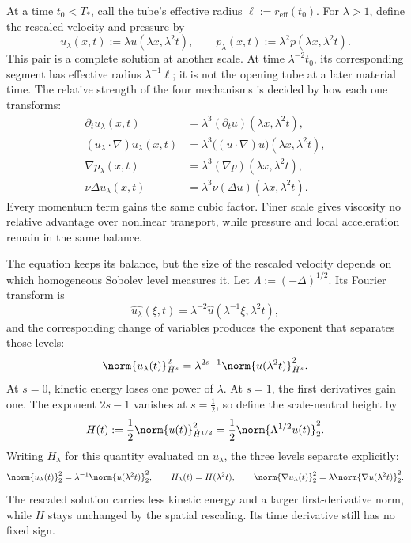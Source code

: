 
At a time \(t_0<T_*\), call the tube's effective radius \(\ell:=r_{\mathrm{eff}}(t_0)\). For \(\lambda>1\), define the rescaled velocity and pressure by
\[
  u_\lambda(x,t)
  :=
  \lambda u(\lambda x,\lambda^2t),
  \qquad
  p_\lambda(x,t)
  :=
  \lambda^2p(\lambda x,\lambda^2t).
\]
This pair is a complete \NavierStokes{} solution at another scale. At time \(\lambda^{-2}t_0\), its corresponding segment has effective radius \(\lambda^{-1}\ell\); it is not the opening tube at a later material time. The relative strength of the four mechanisms is decided by how each one transforms:
\[
\begin{aligned}
  \partial_tu_\lambda(x,t)
  &=
  \lambda^3(\partial_tu)(\lambda x,\lambda^2t),
  \\
  (u_\lambda\cdot\nabla)u_\lambda(x,t)
  &=
  \lambda^3\bigl((u\cdot\nabla)u\bigr)(\lambda x,\lambda^2t),
  \\
  \nabla p_\lambda(x,t)
  &=
  \lambda^3(\nabla p)(\lambda x,\lambda^2t),
  \\
  \nu\Delta u_\lambda(x,t)
  &=
  \lambda^3\nu(\Delta u)(\lambda x,\lambda^2t).
\end{aligned}
\]
Every momentum term gains the same cubic factor. Finer scale gives viscosity no relative advantage over nonlinear transport, while pressure and local acceleration remain in the same balance.


The equation keeps its balance, but the size of the rescaled velocity depends on which homogeneous Sobolev level measures it. Let \(\Lambda:=(-\Delta)^{1/2}\). Its Fourier transform is
\[
  \widehat{u_\lambda}(\xi,t)
  =
  \lambda^{-2}\widehat u(\lambda^{-1}\xi,\lambda^2t),
\]
and the corresponding change of variables produces the exponent that separates those levels:
\[
  \norm{u_\lambda(t)}_{\dot H^s}^2
  =
  \lambda^{2s-1}
  \norm{u(\lambda^2t)}_{\dot H^s}^2.
\]
At \(s=0\), kinetic energy loses one power of \(\lambda\). At \(s=1\), the first derivatives gain one. The exponent \(2s-1\) vanishes at \(s=\tfrac12\), so define the scale-neutral height by
\[
  H(t)
  :=
  \frac12\norm{u(t)}_{\dot H^{1/2}}^2
  =
  \frac12\norm{\Lambda^{1/2}u(t)}_2^2.
\]
Writing \(H_\lambda\) for this quantity evaluated on \(u_\lambda\), the three levels separate explicitly:
\[
  \norm{u_\lambda(t)}_2^2
  =
  \lambda^{-1}\norm{u(\lambda^2t)}_2^2,
  \qquad
  H_\lambda(t)=H(\lambda^2t),
  \qquad
  \norm{\nabla u_\lambda(t)}_2^2
  =
  \lambda\norm{\nabla u(\lambda^2t)}_2^2.
\]
The rescaled solution carries less kinetic energy and a larger first-derivative norm, while \(H\) stays unchanged by the spatial rescaling. Its time derivative still has no fixed sign.

